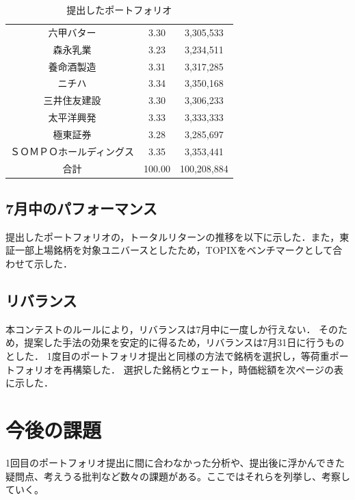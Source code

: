 \documentclass[11pt]{jreport}
\begin{document}
\begin{table}[H]
\begin{center}
\begin{tabular}{|c|c|c|}
六甲バター	&	3.30	&	3,305,533	\\
森永乳業	&	3.23	&	3,234,511	\\
養命酒製造	&	3.31	&	3,317,285	\\
ニチハ	&	3.34	&	3,350,168	\\
三井住友建設	&	3.30	&	3,306,233	\\
太平洋興発	&	3.33	&	3,333,333	\\
極東証券	&	3.28	&	3,285,697	\\
ＳＯＭＰＯホールディングス	&	3.35	&	3,353,441\\
\hline
\hline
合計& 100.00 &  100,208,884\\
\hline
\end{tabular}
\end{center}
\caption{提出したポートフォリオ}
\label{tbl:port1}
\end{table}
\section{7月中のパフォーマンス}

提出したポートフォリオの，トータルリターンの推移を以下に示した．また，東証一部上場銘柄を対象ユニバースとしたため，TOPIXをベンチマークとして合わせて示した．

\section{リバランス}
本コンテストのルールにより，リバランスは7月中に一度しか行えない．
そのため，提案した手法の効果を安定的に得るため，リバランスは7月31日に行うものとした．
1度目のポートフォリオ提出と同様の方法で銘柄を選択し，等荷重ポートフォリオを再構築した．
選択した銘柄とウェート，時価総額を次ページの表に示した．
\chapter{今後の課題}
1回目のポートフォリオ提出に間に合わなかった分析や、提出後に浮かんできた疑問点、考えうる批判など数々の課題がある。ここではそれらを列挙し、考察していく。
\end{document}
